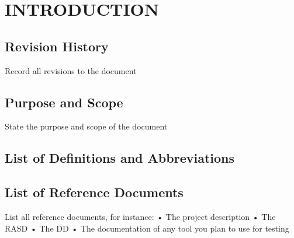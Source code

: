 \section{INTRODUCTION}
\subsection{Revision History}
Record all revisions to the document 

\subsection{Purpose and Scope}
State the purpose and scope of the document

\subsection{List of Definitions and Abbreviations}

\subsection{List of Reference Documents}
List all reference documents, for instance:  
•  The project description 
•  The RASD 
•  The DD 
•  The documentation of any tool you plan to use for testing